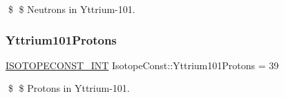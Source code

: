 \$ \$ Neutrons in Yttrium-\/101. \mbox{\label{group___isotope_const-_yttrium-_y101_gaed1124f302bb3cf993d55d1751adf3e1}} 
\subsubsection{\texorpdfstring{Yttrium101\+Protons}{Yttrium101Protons}}
{\footnotesize\ttfamily \mbox{\hyperlink{group___isotope_const-_macros_ga5f18360b3e99483a35c32d789e62621c}{I\+S\+O\+T\+O\+P\+E\+C\+O\+N\+S\+T\+\_\+\+I\+NT}} Isotope\+Const\+::\+Yttrium101\+Protons = 39}

\$ \$ Protons in Yttrium-\/101. 